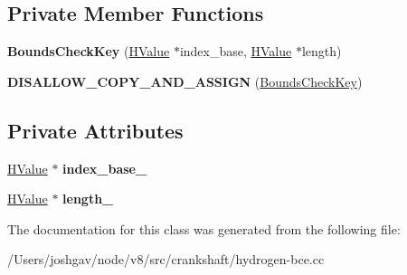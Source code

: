 \subsection*{Private Member Functions}
\begin{DoxyCompactItemize}
\item 
{\bfseries Bounds\+Check\+Key} (\hyperlink{classv8_1_1internal_1_1_h_value}{H\+Value} $\ast$index\+\_\+base, \hyperlink{classv8_1_1internal_1_1_h_value}{H\+Value} $\ast$length)\hypertarget{classv8_1_1internal_1_1_bounds_check_key_a4b830023d3399bfbce736874a4ca9c79}{}\label{classv8_1_1internal_1_1_bounds_check_key_a4b830023d3399bfbce736874a4ca9c79}

\item 
{\bfseries D\+I\+S\+A\+L\+L\+O\+W\+\_\+\+C\+O\+P\+Y\+\_\+\+A\+N\+D\+\_\+\+A\+S\+S\+I\+GN} (\hyperlink{classv8_1_1internal_1_1_bounds_check_key}{Bounds\+Check\+Key})\hypertarget{classv8_1_1internal_1_1_bounds_check_key_afd6410d2aa9cb1ac2692c949f9724531}{}\label{classv8_1_1internal_1_1_bounds_check_key_afd6410d2aa9cb1ac2692c949f9724531}

\end{DoxyCompactItemize}
\subsection*{Private Attributes}
\begin{DoxyCompactItemize}
\item 
\hyperlink{classv8_1_1internal_1_1_h_value}{H\+Value} $\ast$ {\bfseries index\+\_\+base\+\_\+}\hypertarget{classv8_1_1internal_1_1_bounds_check_key_a4ce7c253e8f0612d888f927f42c4e97a}{}\label{classv8_1_1internal_1_1_bounds_check_key_a4ce7c253e8f0612d888f927f42c4e97a}

\item 
\hyperlink{classv8_1_1internal_1_1_h_value}{H\+Value} $\ast$ {\bfseries length\+\_\+}\hypertarget{classv8_1_1internal_1_1_bounds_check_key_a78c8200ff43d770ddb94ecf8723c45b2}{}\label{classv8_1_1internal_1_1_bounds_check_key_a78c8200ff43d770ddb94ecf8723c45b2}

\end{DoxyCompactItemize}


The documentation for this class was generated from the following file\+:\begin{DoxyCompactItemize}
\item 
/\+Users/joshgav/node/v8/src/crankshaft/hydrogen-\/bce.\+cc\end{DoxyCompactItemize}
